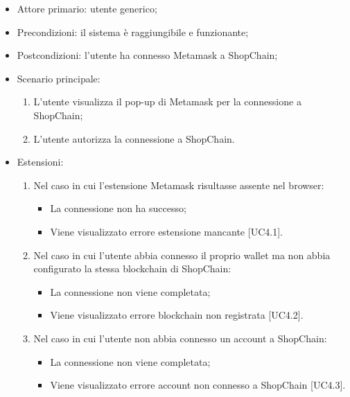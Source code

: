 \begin{itemize}
    \item Attore primario: utente generico;
    \item Precondizioni: il sistema è raggiungibile e funzionante;
    \item Postcondizioni: l'utente ha connesso Metamask\glo{} a ShopChain;
    \item Scenario principale:
        \begin{enumerate}
            \item L'utente visualizza il pop-up di Metamask\glo{} per la connessione a ShopChain;
            \item L'utente autorizza la connessione a ShopChain.
        \end{enumerate}
    \item Estensioni:
        \begin{enumerate}
            \item Nel caso in cui l'estensione Metamask\glo{} risultasse assente nel browser:
                \begin{itemize}
                    \item La connessione non ha successo;
                    \item Viene visualizzato errore estensione mancante [UC4.1].
                \end{itemize}
            \item Nel caso in cui l'utente abbia connesso il proprio wallet\glo{} ma non abbia configurato la stessa blockchain\glo{} di ShopChain:
                \begin{itemize}
                    \item La connessione non viene completata;
                    \item Viene visualizzato errore blockchain\glo{} non registrata [UC4.2].
                \end{itemize}
            \item Nel caso in cui l'utente non abbia connesso un account a ShopChain:
                \begin{itemize}
                    \item La connessione non viene completata;
                    \item Viene visualizzato errore account non connesso a ShopChain [UC4.3].
                \end{itemize}
        \end{enumerate}
\end{itemize}

